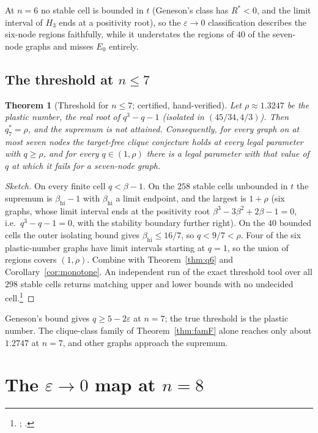 \documentclass[11pt]{article}
\newtheorem{theorem}{Theorem}[section]
\theoremstyle{definition}
\newcommand{\eps}{\varepsilon}
\begin{document}
At $n=6$ no stable cell is bounded in $t$ (Geneson's class has $R^*<0$, and the limit interval of $H_3$ ends at a positivity
root), so the $\eps\to0$ classification describes the six-node regions faithfully, while it understates the regions of $40$ of
the seven-node graphs and misses $E_0$ entirely.

\subsection{The threshold at \texorpdfstring{$n\le7$}{n <= 7}}
\begin{theorem}[Threshold for $n\le7$; certified, hand-verified]\label{thm:q7}
Let $\rho\approx1.3247$ be the plastic number, the real root of $q^3-q-1$ (isolated in $(45/34,4/3)$). Then $q_7^*=\rho$, and
the supremum is not attained. Consequently, for every graph on at most seven nodes the target-free clique conjecture holds at
every legal parameter with $q\ge\rho$, and for every $q\in(1,\rho)$ there is a legal parameter with that value of $q$ at which it
fails for a seven-node graph.
\end{theorem}
\begin{proof}[Sketch]
On every finite cell $q<\beta-1$. On the $258$ stable cells unbounded in $t$ the supremum is $\beta_{\mathrm{hi}}-1$ with
$\beta_{\mathrm{hi}}$ a limit endpoint, and the largest is $1+\rho$ (six graphs, whose limit interval ends at the positivity root
$\beta^3-3\beta^2+2\beta-1=0$, i.e.\ $q^3-q-1=0$, with the stability boundary further right). On the $40$ bounded cells the outer
isolating bound gives $\beta_{\mathrm{hi}}\le16/7$, so $q<9/7<\rho$. Four of the six plastic-number graphs have limit intervals
starting at $q=1$, so the union of regions covers $(1,\rho)$. Combine with Theorem~\ref{thm:q6} and
Corollary~\ref{cor:monotone}. An independent run of the exact threshold tool over all $298$ stable cells returns matching
upper and lower bounds with no undecided cell.\footnote{; .}
\end{proof}

Geneson's bound gives $q\ge5-2\eps$ at $n=7$; the true threshold is the plastic number. The clique-class family of
Theorem~\ref{thm:famF} alone reaches only about $1.2747$ at $n=7$, and other graphs approach the supremum.

\section{The \texorpdfstring{$\eps\to0$}{eps -> 0} map at \texorpdfstring{$n=8$}{n = 8}}\label{sec:n8}
\end{document}
